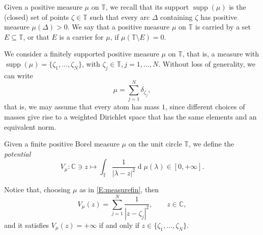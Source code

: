 \documentclass[12pt]{amsart}
\theoremstyle{definition}
\theoremstyle{remark}
\theoremstyle{remark}
\begin{document}
Given a positive measure $\mu$ on $\mathbb{T}$, we recall that its
support $\operatorname{supp}(\mu)$ is the (closed) set of points
$\zeta\in\mathbb{T}$ such that every arc $\Delta$ containing $\zeta$
has positive measure $\mu(\Delta)>0$. We say that a positive measure $\mu$ on $\mathbb{T}$ is carried by a set $E\subseteq\mathbb{T}$, or that $E$ is a carrier for $\mu$, if $\mu(\mathbb{T}\setminus E)=0$.

We consider a finitely supported positive measure $\mu$ on $\mathbb{T}$, that is, a measure with $\operatorname{supp}(\mu)=\{\zeta_1,\ldots,\zeta_N\}$, with $\zeta_j\in\mathbb{T}, j=1,\ldots,N$. Without loss of generality, we can write
\begin{equation} \label{E:measurefin}
    \mu = \sum_{j=1}^N \delta_{\zeta_j},
  \end{equation} 
that is, we may assume that every atom has mass $1$, since different choices of
masses  give rise  to a weighted Dirichlet space that has the same
elements and an equivalent norm.  

Given a finite positive Borel measure $\mu$ on the unit circle $\mathbb{T}$, we define the \emph{potential}
\begin{equation} \label{E:potential}
    V_\mu \colon \mathbb{C}\ni z\mapsto \int_\mathbb{T} \frac{1}{|\lambda-z|^2}\operatorname{d}\!\mu(\lambda)\in[0,+\infty].
\end{equation}

Notice that, choosing $\mu$ as in \eqref{E:measurefin}, then
\[V_\mu(z)=\sum_{j=1}^N\frac{1}{|z-\zeta_j|^2},\qquad z\in\mathbb{C},\]
and it satisfies $V_\mu(z)=+\infty$ if and only if $ z\in\{\zeta_1,\ldots,\zeta_N\}$.
\end{document}

